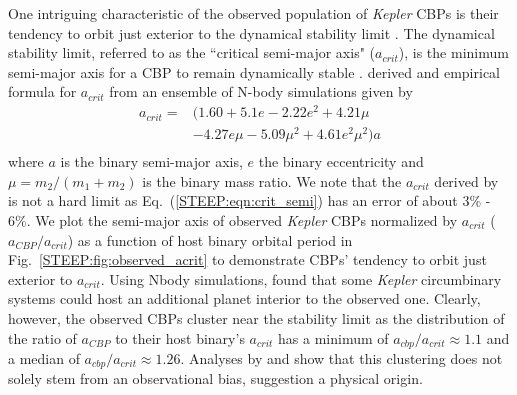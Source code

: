 One intriguing characteristic of the observed population of {\it Kepler} CBPs is their tendency to orbit just exterior to the dynamical stability limit \citep{Welsh2014,Winn2015}.  The dynamical stability limit, referred to as the ``critical semi-major axis" ($a_{crit}$), is the minimum semi-major axis for a CBP to remain dynamically stable \citep{Dvorak1989,Holman1999}.  \citet{Holman1999} derived and empirical formula for $a_{crit}$ from an ensemble of N-body simulations given by
\begin{equation}
\begin{split} \label{STEEP:eqn:crit_semi}
a_{crit} = & (1.60 + 5.1e -2.22 e^2 + 4.21 \mu \\
& -4.27e \mu -5.09 \mu^2 + 4.61 e^2 \mu^2) a \\
\end{split}
\end{equation}
where $a$ is the binary semi-major axis, $e$ the binary eccentricity and $\mu = m_2 / (m_1 + m_2)$ is the binary mass ratio.  We note that the $a_{crit}$ derived by \citet{Holman1999} is not a hard limit as Eq.~(\ref{STEEP:eqn:crit_semi}) has an error of about $3\%$ - $6\%$. We plot the semi-major axis of observed {\it Kepler} CBPs normalized by $a_{crit}$ ($a_{CBP}/a_{crit}$) as a function of host binary orbital period in Fig.~\ref{STEEP:fig:observed_acrit} to demonstrate CBPs' tendency to orbit just exterior to $a_{crit}$.  Using Nbody simulations, \citet{Quarles2018} found that some {\it Kepler} circumbinary systems could host an additional planet interior to the observed one.  Clearly, however, the observed CBPs cluster near the stability limit as the distribution of the ratio of $a_{CBP}$ to their host binary's $a_{crit}$ has a minimum of $a_{cbp}/a_{crit}{\approx} 1.1$ and a median of $a_{cbp}/a_{crit}{\approx} 1.26$. Analyses by \citet{Martin2014} and \citet{Li2016} show that this clustering does not solely stem from an observational bias, suggestion a physical origin.

